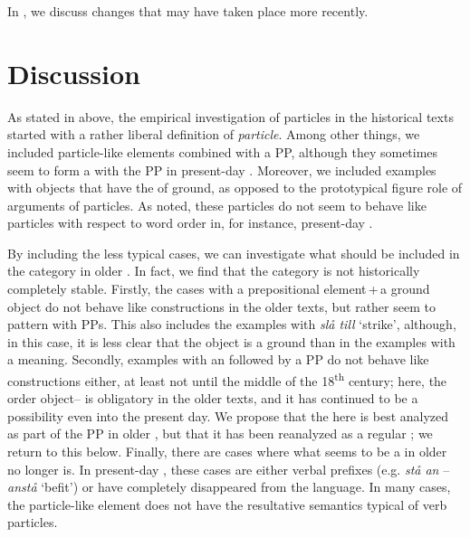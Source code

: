 \documentclass[output=paper]{langscibook}
\begin{document}
In , we discuss changes that may have taken place more recently.


\section{Discussion}\label{sec:lalu:6}


As stated in  above, the empirical investigation of particles in the historical texts started with a rather liberal definition of \textit{particle}. Among other things, we included particle-like elements combined with a PP, although they sometimes seem to form a  with the PP in present-day . Moreover, we included examples with objects that have the  of ground, as opposed to the prototypical figure role of arguments of particles. As noted, these particles do not seem to behave like particles with respect to word order in, for instance, present-day .



By including the less typical cases, we can investigate what should be included in the  category in older . In fact, we find that the category is not historically completely stable. Firstly, the cases with a prepositional element\,+\,a ground object do not behave like  constructions in the older texts, but rather seem to pattern with PPs. This also includes the examples with \textit{slå till} ‘strike’, although, in this case, it is less clear that the object is a ground than in the examples with a  meaning. Secondly, examples with an  followed by a PP do not behave like  constructions either, at least not until the middle of the 18\textsuperscript{th} century; here, the order object– is obligatory in the older texts, and it has continued to be a possibility even into the present day. We propose that the  here is best analyzed as part of the PP in older , but that it has been reanalyzed as a regular ; we return to this below. Finally, there are cases where what seems to be a  in older  no longer is. In present-day , these cases are either verbal prefixes (e.g. \textit{stå an} – \textit{anstå} ‘befit’) or have completely disappeared from the language. In many cases, the particle-like element does not have the resultative semantics typical of verb particles. 
\end{document}
